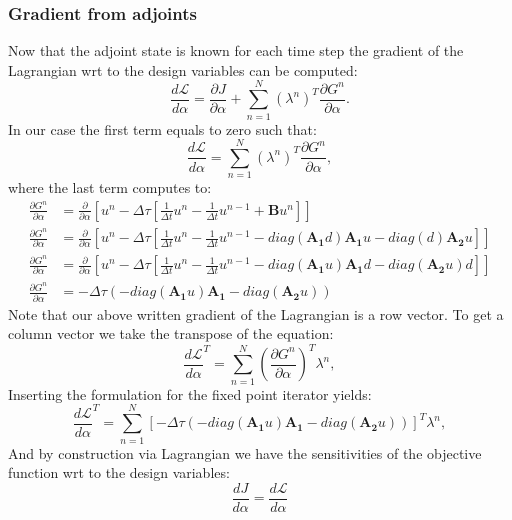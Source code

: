 \subsubsection*{Gradient from adjoints}
Now that the adjoint state is known for each time step the gradient of the Lagrangian wrt to the design variables can be computed:
\begin{equation}
\frac{d \mathcal L}{d \alpha} = \frac{\partial J}{\partial \alpha} + \sum_{n=1}^{N} \left( \lambda^n \right)^T \frac{\partial G^n}{\partial \alpha}.
\end{equation}
In our case the first term equals to zero such that:
\begin{equation}
\frac{d \mathcal L}{d \alpha} =  \sum_{n=1}^{N} \left( \lambda^n \right)^T \frac{\partial G^n}{\partial \alpha},
\end{equation}
where the last term computes to:
\begin{align}
\frac{\partial G^n}{\partial \alpha} &= \frac{\partial}{\partial \alpha}\left[ u^n - \Delta\tau\left[ \frac{1}{\Delta t} u^{n} - \frac{1}{\Delta t} u^{n-1} + \mathbf{B}u^n  \right] \right] \\
\frac{\partial G^n}{\partial \alpha} &= \frac{\partial}{\partial \alpha}\left[ u^n - \Delta\tau\left[ \frac{1}{\Delta t} u^{n} - \frac{1}{\Delta t} u^{n-1} -diag(\mathbf{A_1}d)\mathbf{A_1}u - diag(d) \mathbf{A_2}u  \right] \right]\\
\frac{\partial G^n}{\partial \alpha} &= \frac{\partial}{\partial \alpha}\left[ u^n - \Delta\tau\left[ \frac{1}{\Delta t} u^{n} - \frac{1}{\Delta t} u^{n-1} -diag(\mathbf{A_1}u)\mathbf{A_1}d - diag(\mathbf{A_2}u) d  \right] \right] \\
\frac{\partial G^n}{\partial \alpha} &= -\Delta\tau \left(-diag(\mathbf{A_1}u)\mathbf{A_1} - diag(\mathbf{A_2}u) \right)
\end{align}
Note that our above written gradient of the Lagrangian is a row vector. To get a column vector we take the transpose of the equation:
\begin{equation}
\frac{d \mathcal L}{d \alpha}^T =  \sum_{n=1}^{N} \left( \frac{\partial G^n}{\partial \alpha} \right)^T \lambda^n,
\end{equation}
Inserting the formulation for the fixed point iterator yields:
\begin{equation}
\frac{d \mathcal L}{d \alpha}^T =  \sum_{n=1}^{N} \left[-\Delta\tau \left( -diag(\mathbf{A_1}u)\mathbf{A_1} - diag(\mathbf{A_2}u) \right) \right]^T \lambda^n,
\end{equation}
And by construction via Lagrangian we have the sensitivities of the objective function wrt to the design variables:
\begin{equation}
\frac{d J}{d \alpha} =\frac{d \mathcal L}{d \alpha}
\end{equation}
